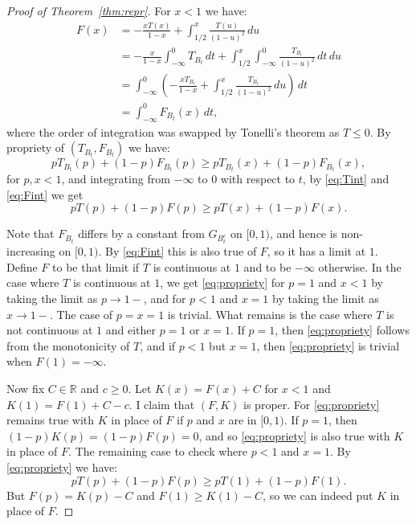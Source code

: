 \documentclass[11pt]{amsart} %
\def\R{\mathbb R}
\begin{document}
\begin{proof}[Proof of Theorem~\ref{thm:repr}]
For $x<1$ we have:
\begin{equation}\label{eq:Fint}
\begin{aligned}
	F(x) &= -\frac{xT(x)}{1-x}+\int_{1/2}^x \frac{T(u)}{(1-u)^2} \, du \\
		 &= -\frac{x}{1-x}\int_{-\infty}^0 T_{B_t} \, dt + \int_{1/2}^x \int_{-\infty}^0 \frac{T_{B_t}}{(1-u)^2} \, dt\, du \\
		 &= \int_{-\infty}^0 \left(-\frac{xT_{B_t}}{1-x}  + \int_{1/2}^x \frac{T_{B_t}}{(1-u)^2} \, du \right) \, dt\\
		 &= \int_{-\infty}^0 F_{B_t}(x) \, dt,
\end{aligned}		 
\end{equation}
where the order of integration was swapped by Tonelli's theorem as $T\le 0$. By propriety of
$(T_{B_t},F_{B_t})$ we have:
$$
	p T_{B_t}(p) + (1-p) F_{B_t}(p) \ge 
	p T_{B_t}(x) + (1-p) F_{B_t}(x),
$$
for $p,x<1$, 
and integrating from $-\infty$ to $0$ with respect to $t$, by \eqref{eq:Tint} and \eqref{eq:Fint} we get
\begin{equation}\label{eq:propriety}
	p T(p) + (1-p) F(p) \ge 
	p T(x) + (1-p) F(x).
\end{equation}

Note that $F_{B_t}$ differs by a constant from $G_{B_t^c}$ on $[0,1)$, and hence is non-increasing on $[0,1)$.
By \eqref{eq:Fint} this is also true of $F$, so it has a limit at $1$. Define $F$ to be that limit if
$T$ is continuous at $1$ and to be $-\infty$ otherwise. In the case where $T$ is continuous at $1$, we get
\eqref{eq:propriety} for $p=1$ and $x<1$ by taking the limit as $p\to 1-$, and for $p<1$ and $x=1$ by
taking the limit as $x\to 1-$. The case of $p=x=1$ is trivial. What remains is the case where $T$ is
not continuous at $1$ and either $p=1$ or $x=1$. If $p=1$, then \eqref{eq:propriety} follows
from the monotonicity of $T$, and if $p<1$ but $x=1$, then \eqref{eq:propriety} is trivial when
$F(1)=-\infty$.

Now fix $C\in\R$ and $c\ge 0$. Let $K(x)=F(x)+C$ for $x<1$ and $K(1)=F(1)+C-c$. I claim that $(F,K)$ is proper.
For \eqref{eq:propriety}
remains true with $K$ in place of $F$ if $p$ and $x$ are in $[0,1)$. If $p=1$, then $(1-p)K(p)=(1-p)F(p)=0$,
and so \eqref{eq:propriety} is also true with $K$ in place of $F$. The remaining case to check where $p<1$ and
$x=1$. By \eqref{eq:propriety} we have:
$$
	p T(p) + (1-p) F(p) \ge p T(1) + (1-p) F(1).
$$
But $F(p)=K(p)-C$ and $F(1)\ge K(1)-C$, so we can indeed put $K$ in place of $F$.


\end{proof}
\end{document}
